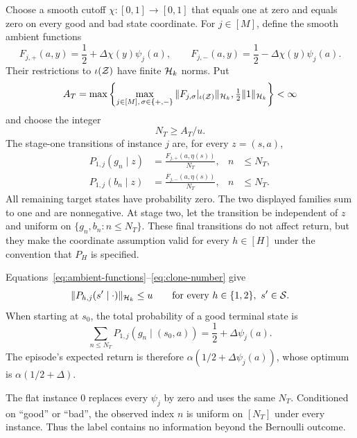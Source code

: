 Choose a smooth cutoff $\chi:[0,1]\to[0,1]$ that equals one at zero and equals
zero on every good and bad state coordinate. For $j\in[M]$, define the smooth
ambient functions
\begin{equation}
 F_{j,+}(a,y)=\frac12+\Delta\chi(y)\psi_j(a),
 \qquad
 F_{j,-}(a,y)=\frac12-\Delta\chi(y)\psi_j(a).
 \label{eq:ambient-functions}
\end{equation}
Their restrictions to $\iota(\mathcal Z)$ have finite $\mathcal H_k$ norms. Put
\begin{equation}
 A_T=\max\left\{
  \max_{j\in[M],\,\sigma\in\{+,-\}}\|F_{j,\sigma}|_{\iota(\mathcal Z)}\|_{\mathcal H_k},
  \tfrac12\|1\|_{\mathcal H_k}
 \right\}<\infty
\end{equation}
and choose the integer
\begin{equation}
 N_T\geq A_T/u.
 \label{eq:clone-number}
\end{equation}
The stage-one transitions of instance $j$ are, for every $z=(s,a)$,
\begin{align}
 P_{1,j}(g_n\mid z)&=\frac{F_{j,+}(a,\eta(s))}{N_T},
 &n&\leq N_T,\label{eq:hard-good}\\
 P_{1,j}(b_n\mid z)&=\frac{F_{j,-}(a,\eta(s))}{N_T},
 &n&\leq N_T.\label{eq:hard-bad}
\end{align}
All remaining target states have probability zero. The two displayed families sum
to one and are nonnegative. At stage two, let the transition be independent of
$z$ and uniform on $\{g_n,b_n:n\leq N_T\}$. These final transitions do not affect
return, but they make the coordinate assumption valid for every $h\in[H]$ under
the convention that $P_H$ is specified.

Equations~\eqref{eq:ambient-functions}--\eqref{eq:clone-number} give
\begin{equation}
 \|P_{h,j}(s'\mid\cdot)\|_{\mathcal H_k}\leq u
 \qquad\text{for every }h\in\{1,2\},\ s'\in\mathcal S.
 \label{eq:coordinate-verified}
\end{equation}
When starting at $s_0$, the total probability of a good terminal state is
\begin{equation}
 \sum_{n\leq N_T}P_{1,j}(g_n\mid(s_0,a))
 =\frac12+\Delta\psi_j(a).
\end{equation}
The episode's expected return is therefore
$\alpha(1/2+\Delta\psi_j(a))$, whose optimum is
$\alpha(1/2+\Delta)$.

The flat instance $0$ replaces every $\psi_j$ by zero and uses the same $N_T$.
Conditioned on ``good'' or ``bad'', the observed index $n$ is uniform on
$[N_T]$ under every instance. Thus the label contains no information beyond the
Bernoulli outcome.

